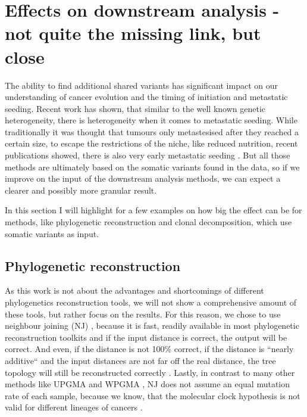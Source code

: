 \section[Effects on downstream analysis]{Effects on downstream analysis - not quite the missing link, but close}
\label{variantcalling-sec:downstream}

The ability to find additional shared variants has significant impact on our understanding of cancer evolution and the timing of initiation and metastatic seeding. Recent work has shown, that similar to the well known genetic heterogeneity, there is heterogeneity when it comes to metastatic seeding. While traditionally it was thought that tumours only metastesised after they reached a certain size, to escape the restrictions of the niche, like reduced nutrition, recent publications showed, there is also very early metastatic seeding \cite{Hu2019}. 
But all those methods are ultimately based on the somatic variants found in the data, so if we improve on the input of the downstream analysis methods, we can expect a clearer and possibly more granular result.

In this section I will highlight for a few examples on how big the effect can be for methods, like phylogenetic reconstruction and clonal decomposition, which use somatic variants as input.

\subsection[Polygenetic reconstruction]{Phylogenetic reconstruction}
\label{variantcalling-sec:phylo}
As this work is not about the advantages and shortcomings of different phylogenetics reconstruction tools, we will not show a comprehensive amount of these tools, but rather focus on the results.  For this reason, we chose to use neighbour joining (NJ) \cite{Saitou1987}, because it is fast, readily available in most phylogenetic reconstruction toolkits and if the input distance is correct, the output will be correct. And even, if the distance is not 100\% correct, if the distance is ``nearly additive`` and the input distances are not far off the real distance, the tree topology will still be reconstructed correctly \cite{Mihaescu2007}. Lastly, in contrast to many other methods like UPGMA and WPGMA \cite{Sokal1958}, NJ does not assume an equal mutation rate of each sample, because we know, that the molecular clock hypothesis \cite{Zuckerkandl1962} is not valid for different lineages of cancers \cite{Shibata2010}.

